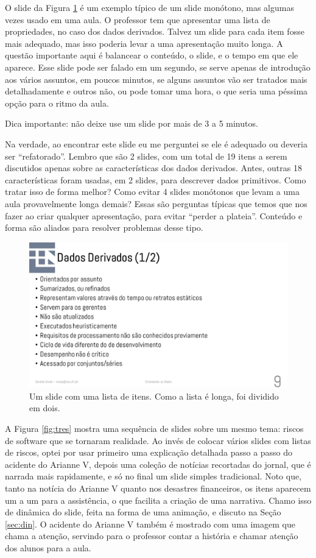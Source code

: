O slide da Figura \ref{fig:dados} é um exemplo típico de um slide monótono, mas algumas vezes usado em uma aula. O professor tem que apresentar uma lista de propriedades, no caso dos dados derivados. Talvez um slide para cada item fosse mais adequado, mas isso poderia levar a uma apresentação muito longa. A questão importante aqui é balancear o conteúdo, o slide, e o tempo em que ele aparece. Esse slide pode ser falado em um segundo, se serve apenas de introdução aos vários assuntos, em poucos minutos, se alguns assuntos vão ser tratados mais detalhadamente e outros não, ou pode tomar uma hora, o que seria uma péssima opção para o ritmo da aula.

Dica importante: não deixe use um slide por mais de 3 a 5 minutos.

Na verdade, ao encontrar este slide eu me perguntei se ele é adequado ou deveria ser ``refatorado''. Lembro que são 2 slides, com um total de 19 itens a serem discutidos apenas sobre as características dos dados derivados. Antes, outras 18 características foram usadas, em 2 slides, para descrever dados primitivos. Como tratar isso de forma melhor? Como evitar 4 slides monótonos que levam a uma aula provavelmente longa demais? Essas são perguntas típicas que temos que nos fazer ao criar qualquer apresentação, para evitar ``perder a plateia''. Conteúdo e forma são aliados para resolver problemas desse tipo.

\begin{figure}[tbh]
    \centering
    \includegraphics[width=\tam\linewidth,frame]{imagens/dados}
    \caption{Um slide com uma lista de itens. Como a lista é longa, foi dividido em dois.}
    \label{fig:dados}
\end{figure}


A Figura \ref{fig:tres} mostra uma sequência de slides sobre um mesmo tema: riscos de software que se tornaram realidade. Ao invés de colocar vários slides com listas de riscos, optei por usar primeiro uma explicação detalhada passo a passo do acidente do Arianne V, depois uma coleção de notícias recortadas do jornal, que é narrada mais rapidamente, e só no final um slide simples tradicional. Noto que, tanto na notícia do Arianne V quanto nos desastres financeiros, os itens aparecem um a um para a assistência, o que facilita a criação de uma narrativa. Chamo isso de dinâmica do slide, feita na forma de uma animação, e discuto na Seção \ref{sec:din}. O acidente do Arianne V também é mostrado com uma imagem que chama a atenção, servindo para o professor contar a história e chamar atenção dos alunos para a aula.

